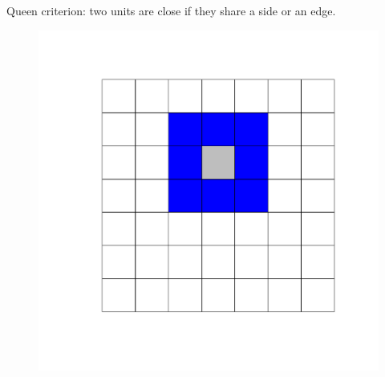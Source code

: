 \documentclass[
  shownotes,
  xcolor={svgnames},
  hyperref={colorlinks,citecolor=DarkBlue,linkcolor=DarkRed,urlcolor=DarkBlue}
  ]{beamer}
\begin{document}
\begin{frame}[fragile]
\begin{minipage}[t]{0.45\linewidth}
    \end{minipage}
    \hfill
\begin{minipage}[t]{0.45\linewidth}%
Queen criterion: two units are close if they share a side or an edge.
  \begin{figure}[H] \centering
    \captionsetup{justification=centering}
    \includegraphics[scale=0.3]{figures/queen.pdf}
   \end{figure}
\end{minipage}


\end{frame}

\end{document}
